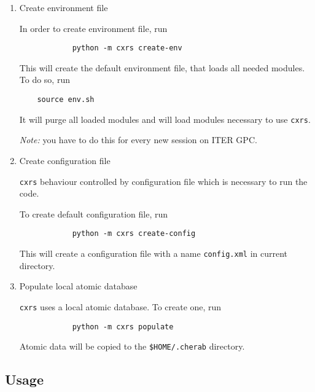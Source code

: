 \documentclass[../main.tex]{subfiles}
\begin{document}
\begin{enumerate}[label = Step \arabic*:, align = left]

    \item Create environment file

          In order to create environment file, run

          \begin{verbatim}
            python -m cxrs create-env
          \end{verbatim}

          This will create the default environment file, that loads all needed modules. To do so, run

          \begin{verbatim}
    source env.sh
\end{verbatim}

          It will purge all loaded modules and will load modules necessary to use \texttt{cxrs}.

          \emph{Note:} you have to do this for every new session on ITER GPC.


    \item {Create configuration file}

          \texttt{cxrs} behaviour controlled by configuration file which is necessary to run the code.

          To create default configuration file, run

          \begin{verbatim}
            python -m cxrs create-config
          \end{verbatim}

          This will create a configuration file with a name \texttt{config.xml} in current directory.


    \item {Populate local atomic database}

          \texttt{cxrs} uses a local atomic database. To create one, run

          \begin{verbatim}
            python -m cxrs populate
          \end{verbatim}

          Atomic data will be copied to the \texttt{\$HOME/.cherab} directory.

\end{enumerate}

\subsection{Usage}
\end{document}
